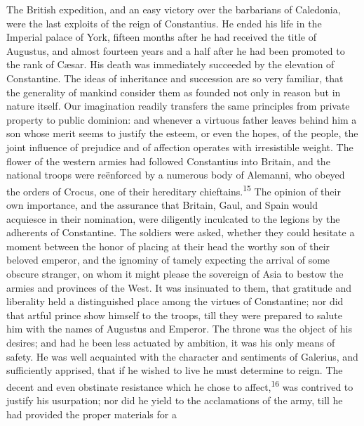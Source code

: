 
The British expedition, and an easy victory over the barbarians
of Caledonia, were the last exploits of the reign of Constantius.
He ended his life in the Imperial palace of York, fifteen months
after he had received the title of Augustus, and almost fourteen
years and a half after he had been promoted to the rank of Cæsar.
His death was immediately succeeded by the elevation of
Constantine. The ideas of inheritance and succession are so very
familiar, that the generality of mankind consider them as founded
not only in reason but in nature itself. Our imagination readily
transfers the same principles from private property to public
dominion: and whenever a virtuous father leaves behind him a son
whose merit seems to justify the esteem, or even the hopes, of
the people, the joint influence of prejudice and of affection
operates with irresistible weight. The flower of the western
armies had followed Constantius into Britain, and the national
troops were reënforced by a numerous body of Alemanni, who obeyed
the orders of Crocus, one of their hereditary chieftains.\textsuperscript{15} The
opinion of their own importance, and the assurance that Britain,
Gaul, and Spain would acquiesce in their nomination, were
diligently inculcated to the legions by the adherents of
Constantine. The soldiers were asked, whether they could hesitate
a moment between the honor of placing at their head the worthy
son of their beloved emperor, and the ignominy of tamely
expecting the arrival of some obscure stranger, on whom it might
please the sovereign of Asia to bestow the armies and provinces
of the West. It was insinuated to them, that gratitude and
liberality held a distinguished place among the virtues of
Constantine; nor did that artful prince show himself to the
troops, till they were prepared to salute him with the names of
Augustus and Emperor. The throne was the object of his desires;
and had he been less actuated by ambition, it was his only means
of safety. He was well acquainted with the character and
sentiments of Galerius, and sufficiently apprised, that if he
wished to live he must determine to reign. The decent and even
obstinate resistance which he chose to affect,\textsuperscript{16} was contrived
to justify his usurpation; nor did he yield to the acclamations
of the army, till he had provided the proper materials for a
